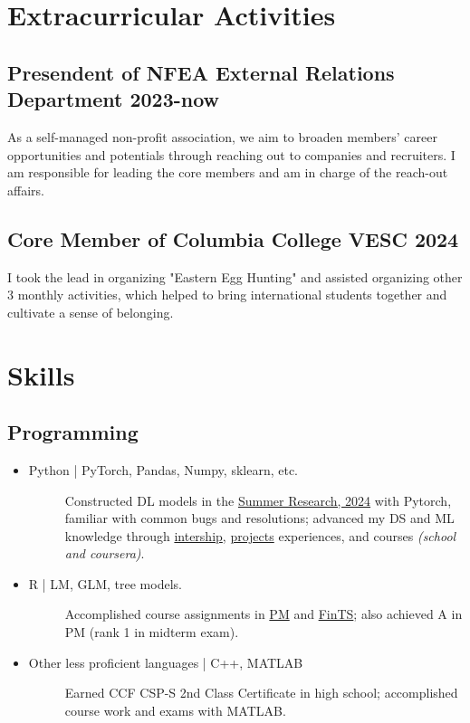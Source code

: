 \documentclass[a4paper]{article}
\begin{document}
\hypertarget{extra}{
\section{Extracurricular Activities}
}
\subsection{Presendent of NFEA External Relations Department \normalfont \hfill 2023-now}
As a self-managed non-profit association, we aim to broaden members' career opportunities and potentials through reaching out to companies and recruiters. I am responsible for leading the core members and am in charge of the reach-out affairs. 
\subsection{Core Member of  Columbia College VESC \normalfont \hfill 2024}
I took the lead in organizing "Eastern Egg Hunting" and assisted organizing other 3 monthly activities, which helped to bring international students together and cultivate a sense of belonging. 

\section{Skills}

\subsection{Programming}
\begin{itemize}
    \item\begin{description}
            \item[Python | PyTorch, Pandas, Numpy, sklearn, etc.] 
            Constructed DL models in the \hyperlink{FBSDEs}{Summer Research, 2024} with Pytorch, familiar with common bugs and resolutions; advanced my DS and ML knowledge through \hyperlink{intern-exp}{intership}, \hyperlink{project-exp}{projects} experiences, and courses \textit{(school and coursera)}.
    \end{description}
    \item\begin{description}
        \item[R | LM, GLM, tree models.] 
        Accomplished course assignments in \hyperlink{PM}{PM} and \hyperlink{FinTS}{FinTS}; also achieved A in PM (rank 1 in midterm exam).
    \end{description}
    \item \begin{description}
        \item[Other less proficient languages | C++, MATLAB] 
        Earned CCF CSP-S 2nd Class Certificate in high school; accomplished course work and exams with MATLAB.
    \end{description}
\end{itemize}
\end{document}
